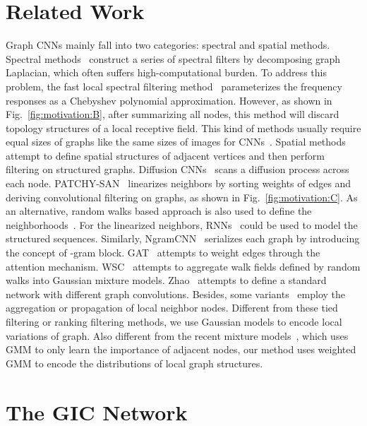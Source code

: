 \documentclass[letterpaper]{article} \usepackage{aaai19}  \usepackage{times}  \usepackage{helvet}  \usepackage{courier}  \usepackage{url}  \usepackage{graphicx}  \frenchspacing  \setlength{\pdfpagewidth}{8.5in}  \setlength{\pdfpageheight}{11in}
\begin{document}
\section{Related Work}

Graph CNNs mainly fall into two categories: spectral and spatial methods. Spectral methods~\cite{bruna2013spectral,scarselli2009graph,henaff2015deep,such2017robust,li2018action,li2018spatio} construct a series of spectral filters by decomposing graph Laplacian, which often suffers high-computational burden. To address this problem, the fast local spectral filtering method~\cite{defferrard2016convolutional} parameterizes the frequency responses as a Chebyshev polynomial approximation. However, as shown in Fig.~\ref{fig:motivation:B}, after summarizing all nodes, this method will discard topology structures of a local receptive field. This kind of methods usually require equal sizes of graphs like the same sizes of images for CNNs~\cite{kipf2016semi}. Spatial methods attempt to define spatial structures of adjacent vertices and then perform filtering on structured graphs. Diffusion CNNs~\cite{atwood2016diffusion} scans a diffusion process across each node. PATCHY-SAN~\cite{niepert2016learning} linearizes neighbors by sorting weights of edges and deriving convolutional filtering on graphs, as shown in Fig.~\ref{fig:motivation:C}. As an alternative, random walks based approach is also used to define the neighborhoods~\cite{perozzi2014deepwalk}. For the linearized neighbors, RNNs~\cite{li2015gated} could be used to model the structured sequences. Similarly, NgramCNN~\cite{luo2017deep} serializes each graph by introducing the concept of -gram block. 
GAT~\cite{velickovic2017graph} attempts to weight edges through the attention mechanism. WSC~\cite{jiang2018walk} attempts to aggregate walk fields defined by random walks into Gaussian mixture models. Zhao~\cite{zhao2018work} attempts to define a standard network with different graph convolutions. Besides, some variants~\cite{hamilton2017inductive,duran2017learning,zhang2018tensor} employ the aggregation or propagation of local neighbor nodes. Different from these tied filtering or ranking filtering methods, we use Gaussian models to encode local variations of graph. Also different from the recent mixture models~\cite{monti2017geometric}, which uses GMM to only learn the importance of adjacent nodes, our method uses weighted GMM to encode the distributions of local graph structures.


\section{The GIC Network}
\end{document}
